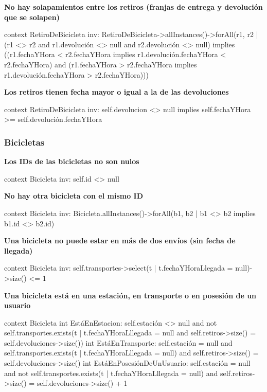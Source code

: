 \documentclass[a4paper, 10pt, twoside]{article}
\newenvironment{ocl}[1]
  {
    \textbf{#1}
    \verbatim
  }{
    \endverbatim
  }
\begin{document}
\begin{ocl}{No hay solapamientos entre los retiros (franjas de entrega y devolución que se solapen)}
  context RetiroDeBicicleta
  inv: RetiroDeBicicleta->allInstances()->forAll(r1, r2 |
           (r1 <> r2 and r1.devolución <> null and r2.devolución <> null) implies
               ((r1.fechaYHora < r2.fechaYHora implies
                   r1.devolución.fechaYHora < r2.fechaYHora) and
                (r1.fechaYHora > r2.fechaYHora implies
                   r1.devolución.fechaYHora > r2.fechaYHora)))
\end{ocl}

\begin{ocl}{Los retiros tienen fecha mayor o igual a la de las devoluciones}
  context RetiroDeBicicleta
  inv: self.devolucion <> null implies self.fechaYHora >= self.devolución.fechaYHora
\end{ocl}


\subsubsection{Bicicletas}

\begin{ocl}{Los IDs de las bicicletas no son nulos}
  context Bicicleta
  inv: self.id <> null
\end{ocl}

\begin{ocl}{No hay otra bicicleta con el mismo ID}
  context Bicicleta
  inv: Bicicleta.allInstances()->forAll(b1, b2 | b1 <> b2 implies b1.id <> b2.id)
\end{ocl}

\begin{ocl}{Una bicicleta no puede estar en más de dos envíos (sin fecha de llegada)}
  context Bicicleta
  inv: self.transportes->select(t | t.fechaYHoraLlegada = null)->size() <= 1
\end{ocl}

\begin{ocl}{Una bicicleta está en una estación, en transporte o en posesión de un usuario}
  context Bicicleta
  int EstáEnEstacion: self.estación <> null and
                      not self.transportes.exists(t |
                          t.fechaYHoraLllegada = null and
                          self.retiros->size() = self.devoluciones->size())
  int EstáEnTransporte: self.estación = null and
                        self.transportes.exists(t | t.fechaYHoraLllegada = null) and
                        self.retiros->size() = self.devoluciones->size()
  int EstáEnPosesiónDeUnUsuario: self.estación = null and
                                 not self.transportes.exists(t |
                                     t.fechaYHoraLllegada = null) and
                                 self.retiros->size() = self.devoluciones->size() + 1
\end{ocl}
\end{document}
